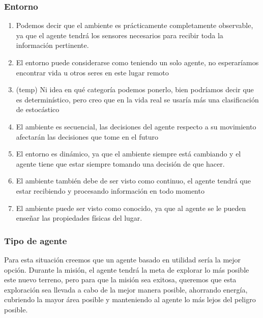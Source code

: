 \documentclass{article}
\begin{document}
            \subsubsection{Entorno}
                \begin{enumerate}
                    \item Podemos decir que el ambiente es prácticamente completamente  observable, ya que el agente tendrá los sensores necesarios para recibir toda la información pertinente.
                    \item El entorno puede considerarse como teniendo un solo agente, no esperaríamos encontrar vida u otros seres en este lugar remoto
                    \item (temp) Ni idea en qué categoría podemos ponerlo, bien podríamos decir que es determinístico, pero creo que en la vida real se usaría más una clasificación de estocástico
                    \item El ambiente es secuencial, las decisiones del agente respecto a su movimiento afectarán las decisiones que tome en el futuro
                    \item El entorno es dinámico, ya que el ambiente siempre está cambiando y el agente tiene que estar siempre tomando una decisión de que hacer. 
                    \item El ambiente también debe de ser visto como continuo, el agente tendrá que estar recibiendo y procesando información en todo momento
                    \item El ambiente puede ser visto como conocido, ya que al agente se le pueden enseñar las propiedades físicas del lugar.
                \end{enumerate}

            \subsubsection{Tipo de agente}
                Para esta situación creemos que un agente basado en utilidad sería la mejor opción. Durante la misión, el agente tendrá la meta de explorar lo más posible este nuevo terreno, pero para que la misión sea exitosa, queremos que esta exploración sea llevada a cabo de la mejor manera posible, ahorrando energía, cubriendo la mayor área posible y manteniendo al agente lo más lejos del peligro posible.

\end{document}
